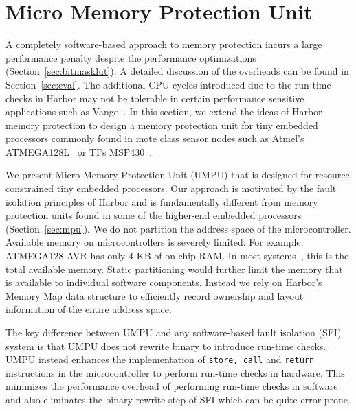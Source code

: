 \section{Micro Memory Protection Unit}
\label{sec:umpu}
%
A completely software-based approach to memory protection incurs a
large performance penalty despite the performance optimizations
(Section~\ref{sec:bitmasklut}).
%
A detailed discussion of the overheads can be found in
Section~\ref{sec:eval}.
%
The additional CPU cycles introduced due to the run-time checks in
Harbor may not be tolerable in certain performance sensitive
applications such as Vango~\cite{ben06vango}.
%
In this section, we extend the ideas of Harbor memory protection to
design a memory protection unit for tiny embedded processors
%
commonly found in mote class sensor nodes%
%
such as Atmel's ATMEGA128L~\cite{avrdatasheet} or TI's
MSP430~\cite{mspdatasheet}.


We present Micro Memory Protection Unit (UMPU) that is designed for
resource constrained tiny embedded processors.
%
Our approach is motivated by the fault isolation principles of Harbor
and is fundamentally different from memory protection units found in
some of the higher-end embedded processors (Section~\ref{sec:mpu}).
%
We do not partition the address space of the microcontroller.
%
Available memory on microcontrollers is severely limited.
%
For example, ATMEGA128 AVR has only 4 KB of on-chip RAM.
%
In most systems~\cite{hill02micro}, this is the total available memory.
%
Static partitioning would further limit the memory that is available
to individual software components.
%
Instead we rely on Harbor's Memory Map data structure to efficiently
record ownership and layout information of the entire address space.
%

The key difference between UMPU and any software-based fault isolation (SFI)
system is that UMPU does not rewrite binary to introduce run-time
checks.
%
UMPU instead enhances the implementation of \texttt{store, call} and
\texttt{return} instructions in the microcontroller to perform
run-time checks in hardware.
%
This minimizes the performance overhead of performing run-time checks
in software and also eliminates the binary rewrite step of SFI which
can be quite error prone.

